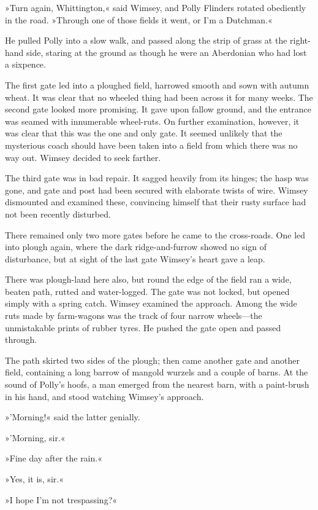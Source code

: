 »Turn again, Whittington,« said Wimsey, and Polly Flinders rotated obediently in the road. »Through one of those fields it went, or I'm a Dutchman.«

He pulled Polly into a slow walk, and passed along the strip of grass at the right-hand side, staring at the ground as though he were an Aberdonian who had lost a sixpence.

The first gate led into a ploughed field, harrowed smooth and sown with autumn wheat. It was clear that no wheeled thing had been across it for many weeks. The second gate looked more promising. It gave upon fallow ground, and the entrance was seamed with innumerable wheel-ruts. On further examination, however, it was clear that this was the one and only gate. It seemed unlikely that the mysterious coach should have been taken into a field from which there was no way out. Wimsey decided to seek farther.

The third gate was in bad repair. It sagged heavily from its hinges; the hasp was gone, and gate and post had been secured with elaborate twists of wire. Wimsey dismounted and examined these, convincing himself that their rusty surface had not been recently disturbed.

There remained only two more gates before he came to the cross-roads. One led into plough again, where the dark ridge-and-furrow showed no sign of disturbance, but at sight of the last gate Wimsey's heart gave a leap.

There was plough-land here also, but round the edge of the field ran a wide, beaten path, rutted and water-logged. The gate was not locked, but opened simply with a spring catch. Wimsey examined the approach. Among the wide ruts made by farm-wagons was the track of four narrow wheels—the unmistakable prints of rubber tyres. He pushed the gate open and passed through.

The path skirted two sides of the plough; then came another gate and another field, containing a long barrow of mangold wurzels and a couple of barns. At the sound of Polly's hoofs, a man emerged from the nearest barn, with a paint-brush in his hand, and stood watching Wimsey's approach.

»'Morning!« said the latter genially.

»'Morning, sir.«

»Fine day after the rain.«

»Yes, it is, sir.«

»I hope I'm not trespassing?«

